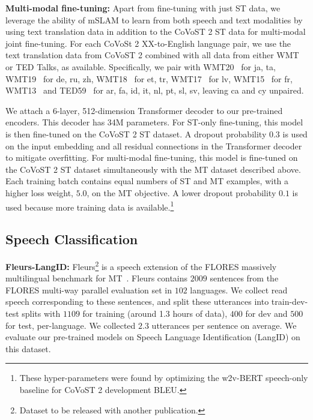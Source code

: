 \documentclass[nohyperref]{article}
\newcommand{\mslam}{mSLAM}
\begin{document}
\textbf{Multi-modal fine-tuning:} Apart from fine-tuning with just ST data, we leverage the ability of \mslam{} to learn from both speech and text modalities by using text translation data in addition to the CoVoST 2 ST data for multi-modal joint fine-tuning. For each CoVoSt 2 XX-to-English language pair, we use the text translation data from CoVoST 2 combined with all data from either WMT or TED Talks, as available. Specifically, we pair with WMT20~\cite{barrault-etal-2020-findings} for ja, ta,  WMT19~\cite{barrault-etal-2019-findings} for de, ru, zh, WMT18~\cite{bojar-etal-2018-findings} for et, tr,  WMT17~\cite{bojar-etal-2017-findings} for lv, WMT15~\cite{bojar-etal-2015-findings} for fr, WMT13~\cite{bojar-etal-2013-findings} and TED59~\cite{qi-etal-2018-pre} for ar, fa, id, it, nl, pt, sl, sv, leaving ca and cy unpaired. 


We attach a 6-layer, 512-dimension Transformer decoder to our pre-trained encoders. This decoder has 34M parameters.
For ST-only fine-tuning, this model is then fine-tuned on the CoVoST 2 ST dataset. A dropout probability $0.3$ is used on the input embedding and all residual connections in the Transformer decoder to mitigate overfitting.
For multi-modal fine-tuning, this model is fine-tuned on the CoVoST 2 ST dataset simultaneously with the MT dataset described above. Each training batch contains equal numbers of ST and MT examples, with a higher loss weight, $5.0$, on the MT objective.
A lower dropout probability $0.1$ is used because more training data is available.\footnote{ These hyper-parameters were found by optimizing the w2v-BERT speech-only baseline for CoVoST 2 development BLEU.}

\subsection{Speech Classification}
\label{subsec:tasks-sc}
\textbf{Fleurs-LangID:} Fleurs\footnote{Dataset to be released with another publication.} is a speech extension of the FLORES massively multilingual benchmark for MT~\citep{goyal2021flores}. Fleurs contains $2009$ sentences from the FLORES multi-way parallel evaluation set in $102$ languages. We collect read speech corresponding to these sentences, and split these utterances into train-dev-test splits with $1109$ for training (around 1.3 hours of data), $400$ for dev and $500$ for test, per-language. We collected  $2.3$ utterances per sentence on average. We evaluate our pre-trained models on Speech Language Identification (LangID) on this dataset.
\end{document}
